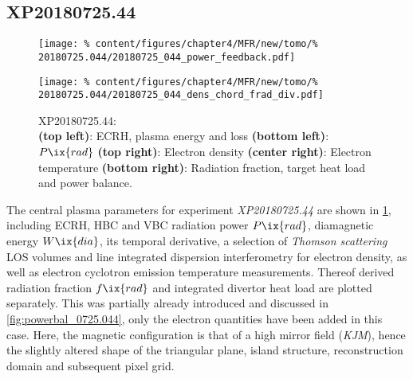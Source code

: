         \subsection*{XP20180725.44}%
%
            \begin{figure}[t]%
                \centering%
                \captionsetup{width=.47\textwidth}%
                \begin{minipage}[c]{0.47\textwidth}%
                    \centering%
                    \texttt{[image: \%
                        content/figures/chapter4/MFR/new/tomo/\%
                        20180725.044/20180725\_044\_power\_feedback.pdf]}%
                    \caption{%
                        XP20180725.44:\\%
                        \textbf{(top left)}: ECRH, plasma energy and loss \textbf{(bottom left)}: $P\ix{rad}$ \textbf{(top right)}: Electron density \textbf{(center right)}: Electron temperature \textbf{(bottom right)}: Radiation fraction, target heat load and power balance.}\label{fig:20180725.44_PDF}%
                \end{minipage}%
                \hfill%
                \begin{minipage}[c]{0.47\textwidth}%
                    \centering%
                    \texttt{[image: \%
                        content/figures/chapter4/MFR/new/tomo/\%
                        20180725.044/20180725\_044\_dens\_chord\_frad\_div.pdf]}%
                \end{minipage}%
            \end{figure}%
%
            The central plasma parameters for experiment \textit{XP20180725.44} are shown in \cref{fig:20180725.44_PDF}, including ECRH, HBC and VBC radiation power $P\ix{rad}$, diamagnetic energy $W\ix{dia}$, its temporal derivative, a selection of \textit{Thomson scattering} LOS volumes and line integrated dispersion interferometry for electron density, as well as electron cyclotron emission temperature measurements. Thereof derived radiation fraction $f\ix{rad}$ and integrated divertor heat load are plotted separately. This was partially already introduced and discussed in \cref{fig:powerbal_0725.044}, only the electron quantities have been added in this case. Here, the magnetic configuration is that of a high mirror field (\textit{KJM}), hence the slightly altered shape of the triangular plane, island structure, reconstruction domain and subsequent pixel grid.\\%
%
